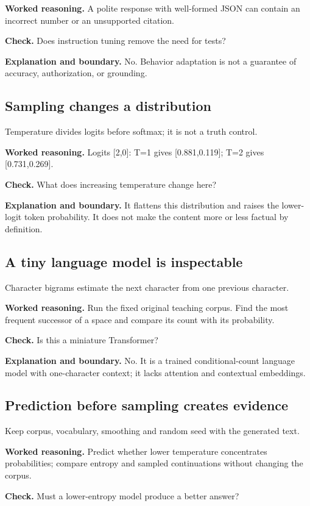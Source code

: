 \textbf{Worked reasoning.} A polite response with well-formed JSON can contain an incorrect number or an unsupported citation.

\textbf{Check.} Does instruction tuning remove the need for tests?

\textbf{Explanation and boundary.} No. Behavior adaptation is not a guarantee of accuracy, authorization, or grounding.

\subsection{Sampling changes a distribution}
Temperature divides logits before softmax; it is not a truth control.

\textbf{Worked reasoning.} Logits [2,0]: T=1 gives [0.881,0.119]; T=2 gives [0.731,0.269].

\textbf{Check.} What does increasing temperature change here?

\textbf{Explanation and boundary.} It flattens this distribution and raises the lower-logit token probability. It does not make the content more or less factual by definition.

\subsection{A tiny language model is inspectable}
Character bigrams estimate the next character from one previous character.

\textbf{Worked reasoning.} Run the fixed original teaching corpus. Find the most frequent successor of a space and compare its count with its probability.

\textbf{Check.} Is this a miniature Transformer?

\textbf{Explanation and boundary.} No. It is a trained conditional-count language model with one-character context; it lacks attention and contextual embeddings.

\subsection{Prediction before sampling creates evidence}
Keep corpus, vocabulary, smoothing and random seed with the generated text.

\textbf{Worked reasoning.} Predict whether lower temperature concentrates probabilities; compare entropy and sampled continuations without changing the corpus.

\textbf{Check.} Must a lower-entropy model produce a better answer?


